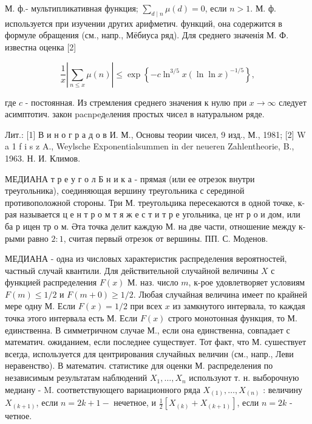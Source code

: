 \documentclass[10pt]{article}
\begin{document}
М. ф.- мультипликативная функция; $\sum_{d \mid n} \mu(d)=0$, если $n>1$. М. ф. используется при изучении других арифметич. функций, она содержится в формуле обращения (см., напр., Мёбиуса ряд). Для среднего значенія М. Ф. известна оценка [2]



\[

\frac{1}{x}\left|\sum_{n \leqslant x} \mu(n)\right| \leqslant \exp \left\{-c \ln ^{3 / 5} x(\ln \ln x)^{-1 / 5}\right\},

\]



где $c$ - постоянная. Из стремления среднего значения к нулю при $x \rightarrow \infty$ следует асимптотич. закон pacnpeдeления простых чисел в натуральном ряде.



Лит.: [1] В и н о г р а д о в И. М., Основы теории чисел, 9 изд., М., 1981; [2] W a 1 f i s z A., Weylsche Exponentialsummen in der neueren Zahlentheorie, B., 1963. Н. И. Климов.



МЕДИАНА т р е у г о л Б н и к а - прямая (или ее отрезок внутри треугольника), соединяющая вершину треугольника с серединой противоположной стороны. Три М. треугольџика пересекаются в одной точке, к-рая называется ц е н т р о м т я ж е с т и т р е угольника, це нт р о и дом, или ба р ицен тр о м. Әта точка делит каждую М. на две части, отношение между к-рыми равно $2: 1$, считая первый отрезок от вершины. ПП. С. Моденов.



МЕДИАНА - одна из числовых характеристик распределения вероятностей, частный случай квантили. Для действительной случайной величины $X$ с функцией распределения $F(x)$ М. наз. число $m$, к-рое удовлетворяет условиям $F(m) \leqslant 1 / 2$ и $F(m+0) \geqslant 1 / 2$. Любая случайная величина имеет по крайней мере одну М. Если $F(x)=1 / 2$ при всех $x$ из замкнутого интервала, то каждая точка этого интервала есть М. Если $F(x)$ строго монотонная функция, то М. единственна. В симметричном случае М., если она единственна, совпадает с математич. ожиданием, если последнее существует. Тот факт, что М. сушествует всегда, используется для центрирования случайных величин (см., напр., Леви неравенство). В математич. статистике для оценки М. распределения по независимым результатам наблюдений $X_{1}, \ldots, X_{n}$ используют т. н. выборочную медиану - M. соответствующего вариационного ряда $X_{(1)}, \ldots, X_{(n)}$ : величину $X_{(k+1)}$, если $n=2 k+1-$ нечетное, и $\frac{1}{2}\left[X_{(k)}+X_{(k+1)}\right]$, если $n=2 k$ - четное.
\end{document}
